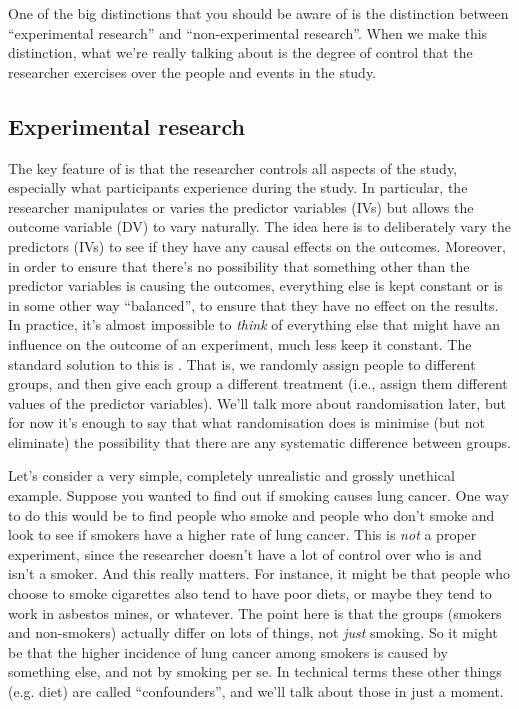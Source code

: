 One of the big distinctions that you should be aware of is the distinction between ``experimental research'' and ``non-experimental research''. When we make this distinction, what we're really talking about is the degree of control that the researcher exercises over the people and events in the study.

\subsection{Experimental research}

The key feature of  is that the researcher controls all aspects of the study, especially what participants experience during the study. In particular, the researcher manipulates or varies the predictor variables (IVs) but allows the outcome variable (DV) to vary naturally. The idea here is to deliberately vary the predictors (IVs) to see if they have any causal effects on the outcomes. Moreover, in order to ensure that there's no possibility that something other than the predictor variables is causing the outcomes, everything else is kept constant or is in some other way ``balanced'', to ensure that they have no effect on the results. In practice, it's almost impossible to {\it think} of everything else that might have an influence on the outcome of an experiment, much less keep it constant. The standard solution to this is . That is, we randomly assign people to different groups, and then give each group a different treatment (i.e., assign them different values of the predictor variables). We'll talk more about randomisation later, but for now it's enough to say that what randomisation does is minimise (but not eliminate) the possibility that there are any systematic difference between groups. 

Let's consider a very simple, completely unrealistic and grossly unethical example. Suppose you wanted to find out if smoking causes lung cancer. One way to do this would be to find people who smoke and people who don't smoke and look to see if smokers have a higher rate of lung cancer. This is {\it not} a proper experiment, since the researcher doesn't have a lot of control over who is and isn't a smoker. And this really matters. For instance, it might be that people who choose to smoke cigarettes also tend to have poor diets, or maybe they tend to work in asbestos mines, or whatever. The point here is that the groups (smokers and non-smokers) actually differ on lots of things, not {\it just} smoking. So it might be that the higher incidence of lung cancer among smokers is caused by something else, and not by smoking per se. In technical terms these other things (e.g. diet) are called ``confounders'', and we'll talk about those in just a moment. 


